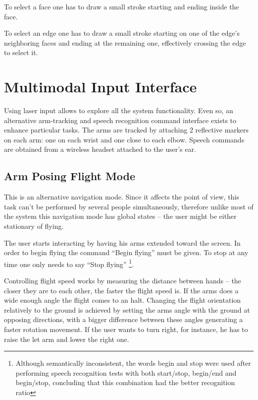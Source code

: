 To select a face one has to draw a small stroke starting and ending inside the face.

To select an edge one has to draw a small stroke starting on one of the edge's neighboring faces and ending at the remaining one,
effectively crossing the edge to select it.



\section{Multimodal Input Interface}

Using laser input allows to explore all the system functionality.
Even so, an alternative arm-tracking and speech recognition command interface exists to enhance particular tasks.
The arms are tracked by attaching 2 reflective markers on each arm: one on each wrist and one close to each elbow.
Speech commands are obtained from a wireless headset attached to the user's ear.


\subsection{Arm Posing Flight Mode}

This is an alternative navigation mode. Since it affects the point of view, this task can't be performed by
several people simultaneously, therefore unlike most of the system this navigation mode has global states
-- the user might be either stationary of flying.

The user starts interacting by having his arms extended toward the screen.
In order to begin flying the command ``Begin flying'' must be given.
To stop at any time one only needs to say ``Stop flying''
\footnote{Although semantically inconsistent, the words begin and stop were used after performing speech recognition
tests with both start/stop, begin/end and begin/stop, concluding that this combination had the better recognition ratio}.

Controlling flight speed works by measuring the distance between hands -- the closer they are to each other, the faster
the flight speed is. If the arms does a wide enough angle the flight comes to an halt.
Changing the flight orientation relatively to the ground is achieved by setting the arms angle with the ground at opposing directions,
with a bigger difference between these angles generating a faster rotation movement. If the user wants to turn right, for instance,
he has to raise the let arm and lower the right one.

